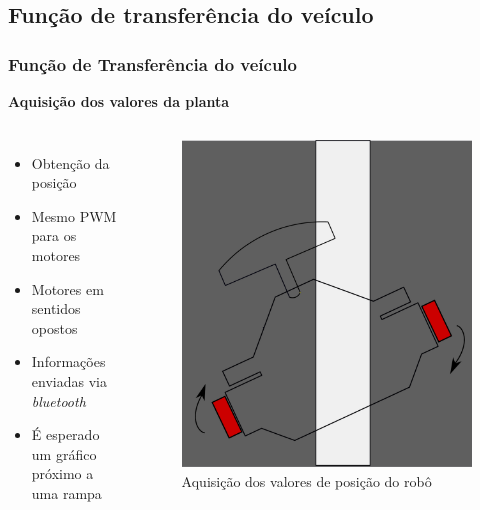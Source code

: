 \subsection{Função de transferência do veículo}

\begin{frame}
\frametitle{Função de Transferência do veículo}
\textbf{Aquisição dos valores da planta}
\begin{columns}
		\begin{itemize}
		\item Obtenção da posição
		\item Mesmo PWM para os motores
		\item Motores em sentidos opostos
		\item Informações enviadas via \textit{bluetooth}
		\item É esperado um gráfico próximo a uma rampa
		\end{itemize}
		\begin{figure}[th]
		\centering
		\captionsetup{width=\textwidth,font=footnotesize,textfont=bf}
		\includegraphics[width=0.6\linewidth,keepaspectratio]{Figuras/FT.pdf}
		\caption{Aquisição dos valores de posição do robô}				
		\end{figure}
\end{columns}
\end{frame}


